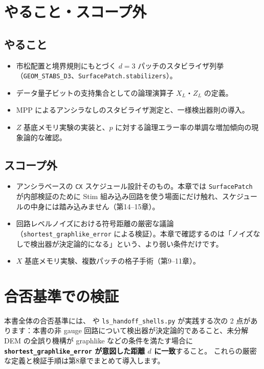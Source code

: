 \section{やること・スコープ外}\label{ch7:scope}

\subsection{やること}

\begin{itemize}
  \item 市松配置と境界規則にもとづく $d=3$ パッチのスタビライザ列挙（\texttt{GEOM\_STABS\_D3}、\texttt{SurfacePatch.stabilizers}）。
  \item データ量子ビットの支持集合としての論理演算子 $X_L$・$Z_L$ の定義。
  \item MPP によるアンシラなしのスタビライザ測定と、一様検出器則の導入。
  \item $Z$ 基底メモリ実験の実装と、$p$ に対する論理エラー率の単調な増加傾向の現象論的な確認。
\end{itemize}

\subsection{スコープ外}

\begin{itemize}
  \item アンシラベースの \texttt{CX} スケジュール設計そのもの。本章では \texttt{SurfacePatch} が内部検証のために Stim 組み込み回路を使う場面にだけ触れ、スケジュールの中身には踏み込みません（第14–15章）。
  \item 回路レベルノイズにおける符号距離の厳密な議論（\texttt{shortest\_graphlike\_error} による検証）。本章で確認するのは「ノイズなしで検出器が決定論的になる」という、より弱い条件だけです。
  \item $X$ 基底メモリ実験、複数パッチの格子手術（第9–11章）。
\end{itemize}

\section{合否基準での検証}\label{ch7:verification}

本書全体の合否基準には、 や \texttt{ls\_handoff\_shells.py} が実践する次の 2 点があります：本書の非 gauge 回路について検出器が決定論的であること、未分解 DEM の全誤り機構が graphlike などの条件を満たす場合に\textbf{\texttt{shortest\_graphlike\_error} が意図した距離 $d$ に一致}すること。
これらの厳密な定義と検証手順は第8章でまとめて導入します。

